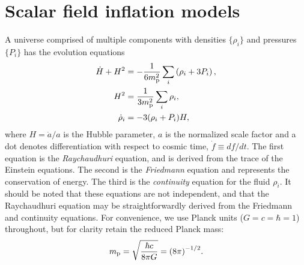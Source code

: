 \section{Scalar field inflation models}
\label{sec:Scalar_field_inflation_models}
%
A universe comprised of multiple components  with densities
$\{\rho_i\}$ and pressures $\{P_i\}$ has the evolution equations
%
\begin{align}
  \dot{H}+H^2 &= 
  -\frac{1}{6m_{\mathrm{p}}^2}\sum\limits_i\left( \rho_i + 3P_i\right), 
  \label{eqn:Raychaudhuri_rho}
  \\
  H^2 &= 
  \frac{1}{3m_{\mathrm{p}}^2}\sum\limits_i \rho_i, 
  \\
  \dot{\rho}_i 
  &= -3(\rho_i + P_i)H,  
  \label{eqn:conservation}
\end{align}
%
where $H=\dot{a}/a$ is the Hubble parameter, $a$ is the normalized scale factor and a dot denotes differentiation with respect to cosmic time, $\dot{f}\equiv df/dt$. The first equation is the {\em Raychaudhuri\/} equation, and is derived from the trace of the Einstein equations. The second is the {\em Friedmann\/} equation and represents the conservation of energy. The third is the {\em continuity\/} equation for the fluid $\rho_i$. It should be noted that these equations are not independent, and that the Raychaudhuri equation may be straightforwardly derived from the Friedmann and continuity equations.  For convenience, we use Planck units ($G=c=\hbar=1$) throughout, but for clarity retain the reduced Planck mass: 
%
\[m_{\mathrm{p}} = \sqrt{\frac{\hbar c}{8\pi G}} = {(8\pi)}^{-1/2}.\]  
%


